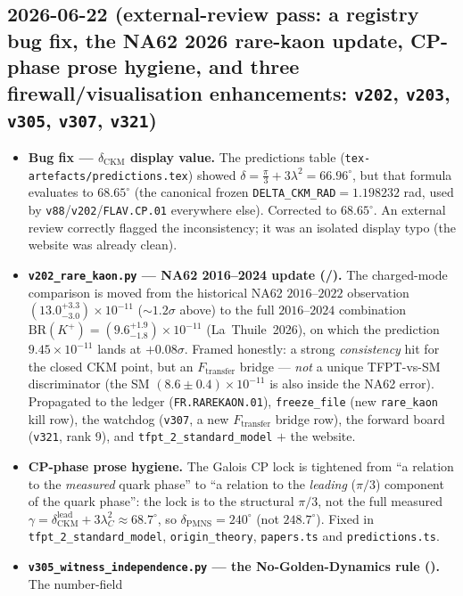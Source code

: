 \subsection*{2026-06-22 (external-review pass: a registry bug fix, the NA62 2026 rare-kaon update, CP-phase prose hygiene, and three firewall/visualisation enhancements: \texttt{v202}, \texttt{v203}, \texttt{v305}, \texttt{v307}, \texttt{v321})}
\begin{itemize}
\item \textbf{Bug fix --- $\delta_{\mathrm{CKM}}$ display value.} The predictions table (\texttt{tex-artefacts/predictions.tex})
  showed $\delta=\tfrac\pi3+3\lambda^2=66.96^\circ$, but that formula evaluates to $68.65^\circ$ (the canonical
  frozen \texttt{DELTA\_CKM\_RAD}$=1.198232$ rad, used by \texttt{v88}/\texttt{v202}/\texttt{FLAV.CP.01}
  everywhere else). Corrected to $68.65^\circ$. An external review correctly flagged the inconsistency; it was an
  isolated display typo (the website was already clean).
\item \textbf{\texttt{v202\_rare\_kaon.py} --- NA62 2016--2024 update (\mE/\mC).} The charged-mode comparison is
  moved from the historical NA62 $2016$--$2022$ observation $(13.0^{+3.3}_{-3.0})\times10^{-11}$ ($\sim1.2\sigma$
  above) to the full $2016$--$2024$ combination $\mathrm{BR}(K^+)=(9.6^{+1.9}_{-1.8})\times10^{-11}$
  (La~Thuile~2026), on which the prediction $9.45\times10^{-11}$ lands at $+0.08\sigma$. Framed honestly: a strong
  \emph{consistency} hit for the closed CKM point, but an $F_{\mathrm{transfer}}$ bridge --- \emph{not} a unique
  TFPT-vs-SM discriminator (the SM $(8.6\pm0.4)\times10^{-11}$ is also inside the NA62 error). Propagated to the
  ledger (\texttt{FR.RAREKAON.01}), \texttt{freeze\_file} (new \texttt{rare\_kaon} kill row), the watchdog
  (\texttt{v307}, a new $F_{\mathrm{transfer}}$ bridge row), the forward board (\texttt{v321}, rank 9), and
  \texttt{tfpt\_2\_standard\_model} $+$ the website.
\item \textbf{CP-phase prose hygiene.} The Galois CP lock is tightened from ``a relation to the \emph{measured}
  quark phase'' to ``a relation to the \emph{leading} ($\pi/3$) component of the quark phase'': the lock is to the
  structural $\pi/3$, not the full measured $\gamma=\delta_{\mathrm{CKM}}^{\mathrm{lead}}+3\lambda_C^2\approx68.7^\circ$,
  so $\delta_{\mathrm{PMNS}}=240^\circ$ (not $248.7^\circ$). Fixed in \texttt{tfpt\_2\_standard\_model},
  \texttt{origin\_theory}, \texttt{papers.ts} and \texttt{predictions.ts}.
\item \textbf{\texttt{v305\_witness\_independence.py} --- the No-Golden-Dynamics rule (\mE).} The number-field

\end{itemize}
